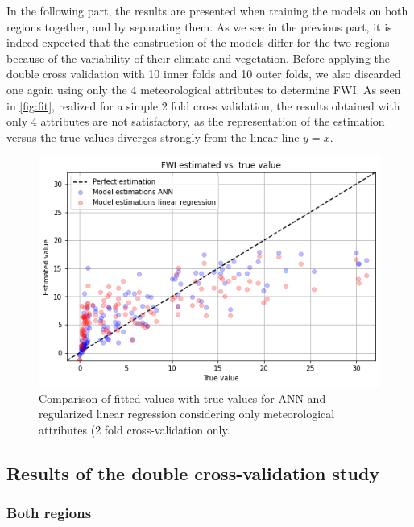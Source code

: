 \documentclass[10pt]{article}
\numberwithin{equation}{section}
\numberwithin{figure}{section}
\numberwithin{table}{section}
\begin{document}
In the following part, the results are presented when training the models on both regions together, and by separating them. As we see in the previous part, it is indeed expected that the construction of the models differ for the two regions because of the variability of their climate and vegetation. Before applying the double cross validation with 10 inner folds and 10 outer folds, we also discarded one again using only the 4 meteorological attributes to determine FWI. As seen in \autoref{fig:fit}, realized for a simple 2 fold cross validation, the results obtained with only 4 attributes are not satisfactory, as the representation of the estimation versus the true values diverges strongly from the linear line $y=x$.  

\begin{figure}[H]
    \centering
    \includegraphics[scale=0.6]{Figures/Est_vs_True_meteo_2fold.png}
    \caption{Comparison of fitted values with true values for ANN and regularized linear regression considering only meteorological attributes (2 fold cross-validation only.}
    \label{fig:fit}
\end{figure}

\subsection{Results of the double cross-validation study}


\subsubsection{Both regions}
\end{document}
